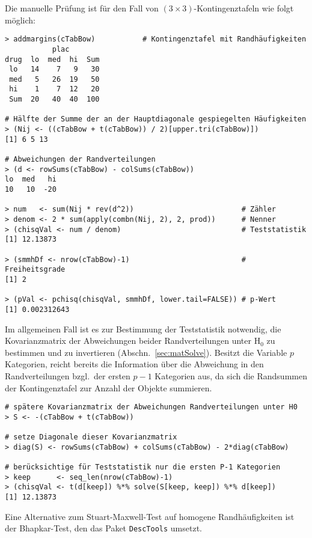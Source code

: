 Die manuelle Prüfung ist für den Fall von $(3 \times 3)$-Kontingenztafeln wie folgt möglich:
\begin{lstlisting}
> addmargins(cTabBow)           # Kontingenztafel mit Randhäufigkeiten
           plac
drug  lo  med  hi  Sum
 lo   14    7   9   30
 med   5   26  19   50
 hi    1    7  12   20
 Sum  20   40  40  100

# Hälfte der Summe der an der Hauptdiagonale gespiegelten Häufigkeiten
> (Nij <- ((cTabBow + t(cTabBow)) / 2)[upper.tri(cTabBow)])
[1] 6 5 13

# Abweichungen der Randverteilungen
> (d <- rowSums(cTabBow) - colSums(cTabBow))
lo  med   hi
10   10  -20

> num   <- sum(Nij * rev(d^2))                         # Zähler
> denom <- 2 * sum(apply(combn(Nij, 2), 2, prod))      # Nenner
> (chisqVal <- num / denom)                            # Teststatistik
[1] 12.13873

> (smmhDf <- nrow(cTabBow)-1)                          # Freiheitsgrade
[1] 2

> (pVal <- pchisq(chisqVal, smmhDf, lower.tail=FALSE)) # p-Wert
[1] 0.002312643
\end{lstlisting}

Im allgemeinen Fall ist es zur Bestimmung der Teststatistik notwendig, die Kovarianzmatrix der Abweichungen beider Randverteilungen unter $\text{H}_{0}$ zu bestimmen und zu invertieren (Abschn.\ \ref{sec:matSolve}). Besitzt die Variable $p$ Kategorien, reicht bereits die Information über die Abweichung in den Randverteilungen bzgl.\ der ersten $p-1$ Kategorien aus, da sich die Randsummen der Kontingenztafel zur Anzahl der Objekte summieren.
\begin{lstlisting}
# spätere Kovarianzmatrix der Abweichungen Randverteilungen unter H0
> S <- -(cTabBow + t(cTabBow))

# setze Diagonale dieser Kovarianzmatrix
> diag(S) <- rowSums(cTabBow) + colSums(cTabBow) - 2*diag(cTabBow)

# berücksichtige für Teststatistik nur die ersten P-1 Kategorien
> keep      <- seq_len(nrow(cTabBow)-1)
> (chisqVal <- t(d[keep]) %*% solve(S[keep, keep]) %*% d[keep])
[1] 12.13873
\end{lstlisting}

Eine Alternative zum Stuart-Maxwell-Test auf homogene Randhäufigkeiten ist der Bhapkar-Test, den das Paket \lstinline!DescTools! umsetzt.
